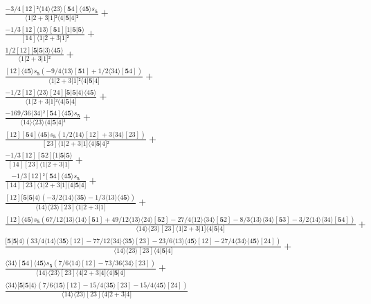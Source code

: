 \documentclass[varwidth, border=5pt]{standalone}
\begin{document}
\begin{my}
$\begin{gathered}
\scriptscriptstyle\frac{-3/4[12]²⟨14⟩⟨23⟩[𝟓4]⟨4𝟓⟩s_{𝟓}}{⟨1|2+3|1]²⟨4|𝟓|4]²} +\\
\scriptscriptstyle\frac{-1/3[12]⟨13⟩[𝟓1][1|𝟓|𝟓⟩}{[14]⟨1|2+3|1]²} +\\
\scriptscriptstyle\frac{1/2[12][𝟓|𝟓|3⟩⟨4𝟓⟩}{⟨1|2+3|1]²} +\\
\scriptscriptstyle\frac{[12]⟨4𝟓⟩s_{𝟓}(-9/4⟨13⟩[𝟓1]+1/2⟨34⟩[𝟓4])}{⟨1|2+3|1]²⟨4|𝟓|4]} +\\
\scriptscriptstyle\frac{-1/2[12]⟨23⟩[24][𝟓|𝟓|4⟩⟨4𝟓⟩}{⟨1|2+3|1]²⟨4|𝟓|4]} +\\
\scriptscriptstyle\frac{-169/36⟨34⟩²[𝟓4]⟨4𝟓⟩s_{𝟓}}{⟨14⟩⟨23⟩⟨4|𝟓|4]²} +\\
\scriptscriptstyle\frac{[12][𝟓4]⟨4𝟓⟩s_{𝟓}(1/2⟨14⟩[12]+3⟨34⟩[23])}{[23]⟨1|2+3|1]⟨4|𝟓|4]²} +\\
\scriptscriptstyle\frac{-1/3[12][𝟓2][1|𝟓|𝟓⟩}{[14][23]⟨1|2+3|1]} +\\
\scriptscriptstyle\frac{-1/3[12]²[𝟓4]⟨4𝟓⟩s_{𝟓}}{[14][23]⟨1|2+3|1]⟨4|𝟓|4]} +\\
\scriptscriptstyle\frac{[12][𝟓|𝟓|4⟩(-3/2⟨14⟩⟨3𝟓⟩-1/3⟨13⟩⟨4𝟓⟩)}{⟨14⟩⟨23⟩[23]⟨1|2+3|1]} +\\
\scriptscriptstyle\frac{[12]⟨4𝟓⟩s_{𝟓}(67/12⟨13⟩⟨14⟩[𝟓1]+49/12⟨13⟩⟨24⟩[𝟓2]-27/4⟨12⟩⟨34⟩[𝟓2]-8/3⟨13⟩⟨34⟩[𝟓3]-3/2⟨14⟩⟨34⟩[𝟓4])}{⟨14⟩⟨23⟩[23]⟨1|2+3|1]⟨4|𝟓|4]} +\\
\scriptscriptstyle\frac{[𝟓|𝟓|4⟩(33/4⟨14⟩⟨3𝟓⟩[12]-77/12⟨34⟩⟨3𝟓⟩[23]-23/6⟨13⟩⟨4𝟓⟩[12]-27/4⟨34⟩⟨4𝟓⟩[24])}{⟨14⟩⟨23⟩[23]⟨4|𝟓|4]} +\\
\scriptscriptstyle\frac{⟨34⟩[𝟓4]⟨4𝟓⟩s_{𝟓}(7/6⟨14⟩[12]-73/36⟨34⟩[23])}{⟨14⟩⟨23⟩[23]⟨4|2+3|4]⟨4|𝟓|4]} +\\
\scriptscriptstyle\frac{⟨34⟩[𝟓|𝟓|4⟩(7/6⟨1𝟓⟩[12]-15/4⟨3𝟓⟩[23]-15/4⟨4𝟓⟩[24])}{⟨14⟩⟨23⟩[23]⟨4|2+3|4]} \phantom{+}
\end{gathered}$
\end{my}
\end{document}
